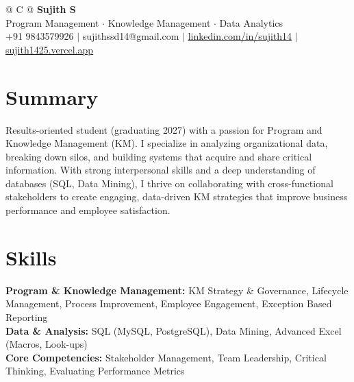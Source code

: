 \documentclass[a4paper,10pt]{article}
\newcommand{\ulink}[2]{\href{#1}{\uline{#2}}}
\begin{document}
\pagestyle{empty}

\begin{tabularx}{\linewidth}{@{} C @{}}
{\color[HTML]{000000}\fontsize{30}{35}\selectfont\bfseries Sujith S} \\[5pt]
{\fontsize{10.5}{12.5}\selectfont\color[HTML]{3A3A3A}
Program Management $\cdot$ Knowledge Management $\cdot$ Data Analytics} \\[6pt]
{\fontsize{9.5}{11.5}\selectfont\textcolor[HTML]{3A3A3A}{+91 9843579926 $|$ sujithssd14@gmail.com $|$ \ulink{https://linkedin.com/in/sujith14}{linkedin.com/in/sujith14} $|$ \ulink{https://sujith1425.vercel.app}{sujith1425.vercel.app}}}
\end{tabularx}

\vspace{2pt}

\section{Summary}
\vspace{3pt}
{\color[HTML]{0A0A0A}\fontsize{11}{14}\selectfont
Results-oriented student (graduating 2027) with a passion for Program and Knowledge Management (KM). I specialize in analyzing organizational data, breaking down silos, and building systems that acquire and share critical information. With strong interpersonal skills and a deep understanding of databases (SQL, Data Mining), I thrive on collaborating with cross-functional stakeholders to create engaging, data-driven KM strategies that improve business performance and employee satisfaction.}

\vspace{2pt}

\section{Skills}
\vspace{3pt}
{\color[HTML]{0A0A0A}\fontsize{11}{14}\selectfont
\textbf{Program \& Knowledge Management:} KM Strategy & Governance, Lifecycle Management, Process Improvement, Employee Engagement, Exception Based Reporting \\[2pt]
\textbf{Data \& Analysis:} SQL (MySQL, PostgreSQL), Data Mining, Advanced Excel (Macros, Look-ups) \\[2pt]
\textbf{Core Competencies:} Stakeholder Management, Team Leadership, Critical Thinking, Evaluating Performance Metrics}
\end{document}
